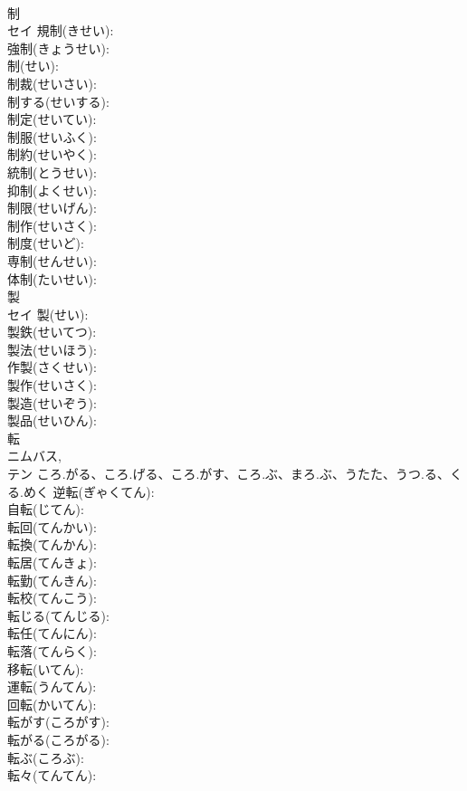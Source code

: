 \documentclass[8pt]{extreport}
\begin{document}
\begin{CJK}{UTF8}{min}
\\	制			
\\	セイ		規制(きせい): 
\\	強制(きょうせい): 
\\	制(せい): 
\\	制裁(せいさい): 
\\	制する(せいする): 
\\	制定(せいてい): 
\\	制服(せいふく): 
\\	制約(せいやく): 
\\	統制(とうせい): 
\\	抑制(よくせい): 
\\	制限(せいげん): 
\\	制作(せいさく): 
\\	制度(せいど): 
\\	専制(せんせい): 
\\	体制(たいせい): 
\\	製		
\\	セイ		製(せい): 
\\	製鉄(せいてつ): 
\\	製法(せいほう): 
\\	作製(さくせい): 
\\	製作(せいさく): 
\\	製造(せいぞう): 
\\	製品(せいひん): 
\\	転			
\\	{ニム}バス, 
\\	テン	ころ.がる、ころ.げる、ころ.がす、ころ.ぶ、まろ.ぶ、うたた、うつ.る、くる.めく	逆転(ぎゃくてん): 
\\	自転(じてん): 
\\	転回(てんかい): 
\\	転換(てんかん): 
\\	転居(てんきょ): 
\\	転勤(てんきん): 
\\	転校(てんこう): 
\\	転じる(てんじる): 
\\	転任(てんにん): 
\\	転落(てんらく): 
\\	移転(いてん): 
\\	運転(うんてん): 
\\	回転(かいてん): 
\\	転がす(ころがす): 
\\	転がる(ころがる): 
\\	転ぶ(ころぶ): 
\\	転々(てんてん): 

\end{CJK}
\end{document}
